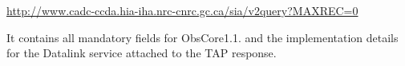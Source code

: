 \documentclass[11pt,a4paper]{ivoa}
\begin{document}
\url{http://www.cadc-ccda.hia-iha.nrc-cnrc.gc.ca/sia/v2query?MAXREC=0}

It contains all mandatory fields for ObsCore1.1. and the implementation details for the Datalink service attached to the
TAP response.




\end{document}
